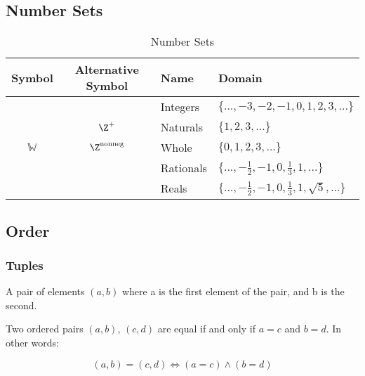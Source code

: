 \documentclass[11pt]{article}
\newcommand\W{\ensuremath{\mathbb{W}}}
\begin{document}
\newpage
\subsection{Number Sets}

\begin{table}[!htbp]
    \centering
    \begin{tabular}{ c c l l }
        \toprule
        Symbol  & Alternative Symbol    & Name      & Domain \\
        \midrule
        \Z      &                       & Integers  & $\{ ..., -3,-2,-1,0,1,2,3, ... \}$ \\
        \N      & $\Z^+$                & Naturals  & $\{ 1,2,3, ... \}$ \\
        \W      & $\Z^{\text{nonneg}}$  & Whole     & $\{ 0,1,2,3, ... \}$ \\
        \Q      &                       & Rationals & $\{ ..., -\frac{1}{2}, -1, 0, \frac{1}{3}, 1, ... \}$ \\
        \R      &                       & Reals     & $\{ ..., -\frac{1}{2}, -1, 0, \frac{1}{3}, 1, \sqrt{5}, ... \}$ \\
        \bottomrule
    \end{tabular}
    \label{tab:tbl-number-sets}
    \caption{Number Sets}
\end{table}

\subsection{Order}

\subsubsection{Tuples}

\begin{definition}\label{def:ordered-pair}
    A pair of elements $(a, b)$ where a is the first
    element of the pair, and b is the second. 
\end{definition}

\begin{definition}\label{def:ordered-pair-eq}
    Two ordered pairs $(a,b)$, $(c,d)$ are equal if and only if
    $a = c$ and $b = d$. In other words:

    \begin{equation}
        (a,b) = (c,d) \iff (a = c) \land (b = d)
    \end{equation}
\end{definition}
\end{document}
